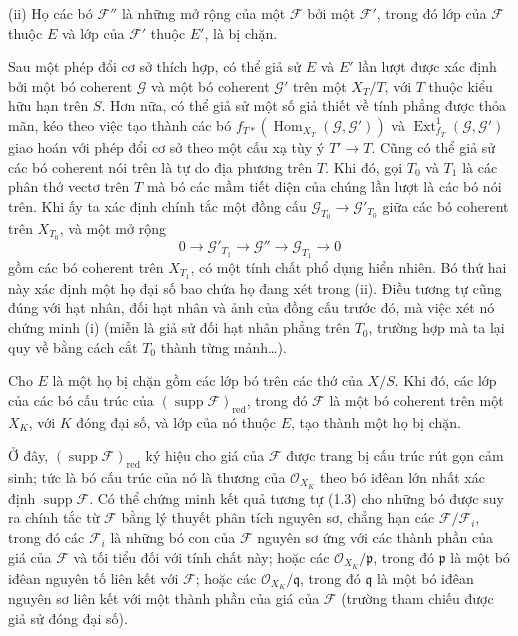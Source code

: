 \smallskip
\noindent (ii) Họ các bó $\mathcal F''$ là những mở rộng của một $\mathcal F$
bởi một $\mathcal F'$, trong đó lớp của $\mathcal F$ thuộc $E$ và lớp của
$\mathcal F'$ thuộc $E'$, là bị chặn.

Sau một phép đổi cơ sở thích hợp, có thể giả sử $E$ và $E'$ lần lượt được xác
định bởi một bó coherent $\mathcal G$ và một bó coherent $\mathcal G'$ trên
một $X_T/T$, với $T$ thuộc kiểu hữu hạn trên $S$. Hơn nữa, có thể giả sử một
số giả thiết về tính phẳng được thỏa mãn, kéo theo việc tạo thành các bó
$f_{T*}(\operatorname{Hom}_{X_T}(\mathcal G,\mathcal G'))$ và
$\operatorname{Ext}^{1}_{f_T}(\mathcal G,\mathcal G')$ giao hoán với phép đổi
cơ sở theo một cấu xạ tùy ý $T'\longrightarrow T$. Cũng có thể giả sử các bó
coherent nói trên là tự do địa phương trên $T$. Khi đó, gọi $T_0$ và $T_1$
là các phân thớ vectơ trên $T$ mà bó các mầm tiết diện của chúng lần lượt là
các bó nói trên. Khi ấy ta xác định chính tắc một đồng cấu
$\mathcal G_{T_0}\longrightarrow\mathcal G'_{T_0}$ giữa các bó coherent trên
$X_{T_0}$, và một mở rộng
\[
0\longrightarrow\mathcal G'_{T_1}\longrightarrow\mathcal G''
\longrightarrow\mathcal G_{T_1}\longrightarrow0
\]
gồm các bó coherent trên $X_{T_1}$, có một tính chất phổ dụng hiển nhiên. Bó
thứ hai này xác định một họ đại số bao chứa họ đang xét trong (ii). Điều tương
tự cũng đúng với hạt nhân, đối hạt nhân và ảnh của đồng cấu
trước đó, mà việc xét nó chứng minh (i) (miễn là giả sử đối hạt nhân phẳng trên
$T_0$, trường hợp mà ta lại quy về bằng cách cắt $T_0$ thành từng
mảnh\ldots).

 Cho $E$ là một họ bị chặn gồm các lớp bó trên các thớ
của $X/S$. Khi đó, các lớp của các bó cấu trúc của
$(\operatorname{supp}\mathcal F)_{\mathrm{red}}$, trong đó $\mathcal F$ là một
bó coherent trên một $X_K$, với $K$ đóng đại số, và lớp của nó thuộc $E$, tạo
thành một họ bị chặn.

Ở đây, $(\operatorname{supp}\mathcal F)_{\mathrm{red}}$ ký hiệu cho giá của
$\mathcal F$ được trang bị cấu trúc rút gọn cảm sinh; tức là bó cấu trúc của nó
là thương của $\mathcal O_{X_K}$ theo bó iđêan lớn nhất xác định
$\operatorname{supp}\mathcal F$. Có thể chứng minh kết quả tương tự (1.3) cho
những bó được suy ra chính tắc từ $\mathcal F$ bằng lý thuyết phân tích nguyên
sơ, chẳng hạn các $\mathcal F/\mathcal F_i$, trong đó các $\mathcal F_i$ là
những bó con của $\mathcal F$ nguyên sơ ứng với các thành phần của giá của
$\mathcal F$ và tối tiểu đối với tính chất này; hoặc các
$\mathcal O_{X_K}/\mathfrak p$, trong đó $\mathfrak p$ là một bó iđêan nguyên
tố liên kết với $\mathcal F$; hoặc các $\mathcal O_{X_K}/\mathfrak q$, trong đó
$\mathfrak q$ là một bó iđêan nguyên sơ liên kết với một thành phần của giá của
$\mathcal F$ (trường tham chiếu được giả sử đóng đại số).

